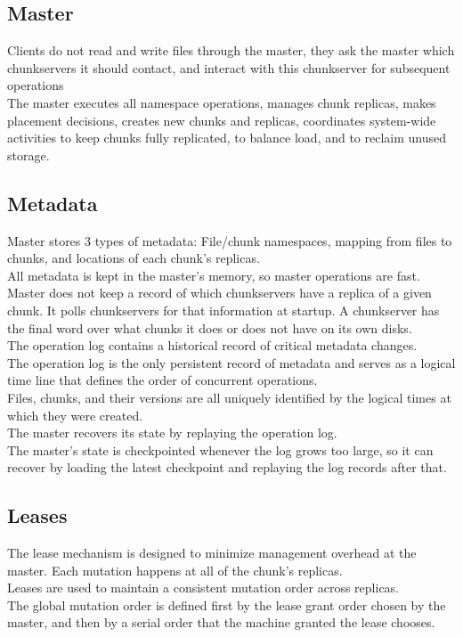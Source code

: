 \subsection{Master}
Clients do not read and write files through the master, they ask the master which chunkservers it should contact, and interact with this chunkserver for subsequent operations\\
The master executes all namespace operations, manages chunk replicas, makes placement decisions, creates new chunks and replicas, coordinates system-wide activities to keep chunks fully replicated, to balance load, and to reclaim unused storage.
\subsection{Metadata}
Master stores 3 types of metadata: File/chunk namespaces, mapping from files to chunks, and locations of each chunk's replicas.\\
All metadata is kept in the master's memory, so master operations are fast.\\
Master does not keep a record of which chunkservers have a replica of a given chunk. It polls chunkservers for that information at startup. A chunkserver has the final word over what chunks it does or does not have on its own disks.\\
The operation log contains a historical record of critical metadata changes. \\
The operation log is the only persistent record of metadata and serves as a logical time line that defines the order of concurrent operations. \\
Files, chunks, and their versions are all uniquely identified by the logical times at which they were created. \\
The master recovers its state by replaying the operation log. \\
The master's state is checkpointed whenever the log grows too large, so it can recover by loading the latest checkpoint and replaying the log records after that.
\subsection{Leases}
The lease mechanism is designed to minimize management overhead at the master.
Each mutation happens at all of the chunk's replicas. \\
Leases are used to maintain a consistent mutation order across replicas.\\
The global mutation order is defined first by the lease grant order chosen by the master, and then by a serial order that the machine granted the lease chooses.\\
